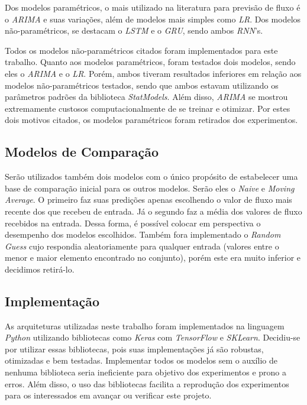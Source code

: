 Dos modelos paramétricos, o mais utilizado na literatura para previsão de fluxo é o \textit{\acrfull{ARIMA}} e suas variações, além de modelos mais simples como \textit{\acrfull{LR}}. Dos modelos não-paramétricos, se destacam o \textit{\acrfull{LSTM}} e o \textit{\acrfull{GRU}}, sendo ambos \textit{\acrshort{RNN}}'s.


Todos os modelos não-paramétricos citados foram implementados para este trabalho. Quanto aos modelos paramétricos, foram testados dois modelos, sendo eles o \textit{\acrshort{ARIMA}} e o \textit{\acrshort{LR}}. Porém, ambos tiveram resultados inferiores em relação aos modelos não-paramétricos testados, sendo que ambos estavam utilizando os parâmetros padrões da biblioteca \textit{StatModels}. Além disso, \textit{\acrshort{ARIMA}} se mostrou extremamente custosos computacionalmente de se treinar e otimizar. Por estes dois motivos citados, os modelos paramétricos foram retirados dos experimentos.

\subsection{Modelos de Comparação}

Serão utilizados também dois modelos com o único propósito de estabelecer uma base de comparação inicial para os outros modelos. Serão eles o \textit{Naive} e \textit{Moving Average}. O primeiro faz suas predições apenas escolhendo o valor de fluxo mais recente dos que recebeu de entrada. Já o segundo faz a média dos valores de fluxo recebidos na entrada. Dessa forma, é possível colocar em perspectiva o desempenho dos modelos escolhidos. Também fora implementado o \textit{Random Guess} cujo respondia aleatoriamente para qualquer entrada (valores entre o menor e maior elemento encontrado no conjunto), porém este era muito inferior e decidimos retirá-lo.

\subsection{Implementação}

As arquiteturas utilizadas neste trabalho foram implementados na linguagem \textit{Python} utilizando bibliotecas como \textit{Keras} com \textit{TensorFlow} e \textit{SKLearn}. Decidiu-se por utilizar essas bibliotecas, pois suas implementações já são robustas, otimizadas e bem testadas. Implementar todos os modelos sem o auxílio de nenhuma biblioteca seria ineficiente para objetivo dos experimentos e prono a erros. Além disso, o uso das bibliotecas facilita a reprodução dos experimentos para os interessados em avançar ou verificar este projeto.

